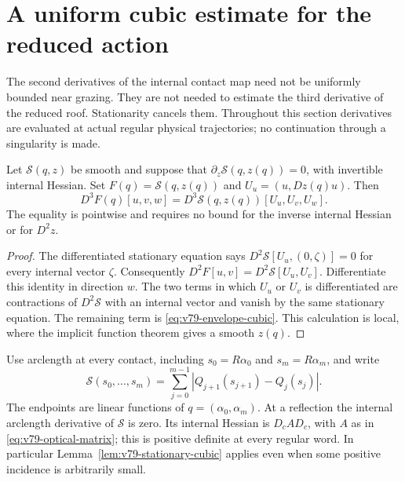 \section{A uniform cubic estimate for the reduced action}
\label{sec:v79-cubic}
The second derivatives of the internal contact map need not be
uniformly bounded near grazing. They are not needed to estimate the
third derivative of the reduced roof. Stationarity cancels them.
Throughout this section derivatives are evaluated at actual regular
physical trajectories; no continuation through a singularity is made.

\begin{lemma}
\label{lem:v79-stationary-cubic}
Let $\mathcal S(q,z)$ be smooth and suppose that
$\partial_z\mathcal S(q,z(q))=0$, with invertible internal Hessian.
Set $F(q)=\mathcal S(q,z(q))$ and
$U_u=(u,Dz(q)u)$. Then
\begin{equation}\label{eq:v79-envelope-cubic}
 D^3F(q)[u,v,w]=D^3\mathcal S(q,z(q))[U_u,U_v,U_w].
\end{equation}
The equality is pointwise and requires no bound for the inverse
internal Hessian or for $D^2z$.
\end{lemma}
\begin{proof}
The differentiated stationary equation says
$D^2\mathcal S[U_u,(0,\zeta)]=0$ for every internal vector $\zeta$.
Consequently $D^2F[u,v]=D^2\mathcal S[U_u,U_v]$.
Differentiate this identity in direction $w$. The two terms in which
$U_u$ or $U_v$ is differentiated are contractions of $D^2\mathcal S$
with an internal vector and vanish by the same stationary equation.
The remaining term is \eqref{eq:v79-envelope-cubic}. This calculation
is local, where the implicit function theorem gives a smooth $z(q)$.
\end{proof}

Use arclength at every contact, including $s_0=R\alpha_0$ and
$s_m=R\alpha_m$, and write
\[
 \mathcal S(s_0,\ldots,s_m)
       =\sum_{j=0}^{m-1}|Q_{j+1}(s_{j+1})-Q_j(s_j)|.
\]
The endpoints are linear functions of $q=(\alpha_0,\alpha_m)$.
At a reflection the internal arclength derivative of $\mathcal S$
is zero. Its internal Hessian is $D_cAD_c$, with $A$ as in
\eqref{eq:v79-optical-matrix}; this is positive definite at every
regular word. In particular Lemma~\ref{lem:v79-stationary-cubic}
applies even when some positive incidence is arbitrarily small.


